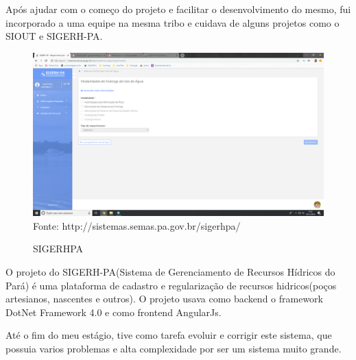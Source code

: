Após ajudar com o começo do projeto e facilitar o desenvolvimento do mesmo, fui incorporado a uma equipe na mesma tribo e cuidava de alguns projetos como o SIOUT e SIGERH-PA.

\begin{figure}[H]
\centering
\caption{SIGERHPA} %
\includegraphics[scale=0.222]{sigerpa}\\  %
{\small Fonte: http://sistemas.semas.pa.gov.br/sigerhpa/} %
\label{fig:exemplo} %
\end{figure}

O projeto do SIGERH-PA(Sistema de Gerenciamento de Recursos Hídricos do Pará) é uma plataforma de cadastro e regularização de recursos hidricos(poços artesianos, nascentes e outros).
O projeto usava como backend o framework DotNet Framework 4.0 e como frontend AngularJs.

Até o fim do meu estágio, tive como tarefa evoluir e corrigir este sistema, que possuia varios problemas e alta complexidade por ser um sistema muito grande.
